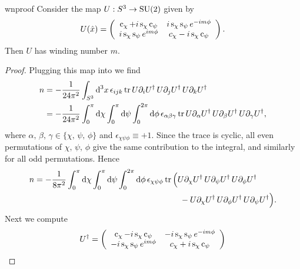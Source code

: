 \begin{proposition}{}{wnproof}
Consider the map $U:S^3\to\operatorname{SU}(2)$ given by
$$
U(\hat{x})=\left(\begin{array}{cc}
             \operatorname{c}_\chi+i\operatorname{s}_\chi\operatorname{c}_\psi     & i\operatorname{s}_\chi\operatorname{s}_\psi e^{-im\phi}\\
             i\operatorname{s}_\chi\operatorname{s}_\psi e^{im\phi}& c_\chi-i\operatorname{s}_\chi\operatorname{c}_\psi 
            \end{array}\right).
$$
Then $U$ has winding number $m$.
\begin{proof}
  Plugging this map into  we find
  \begin{equation*}
  \begin{aligned}
    n&=-\frac{1}{24\pi^2}\int_{S^3} \dd[3]{x}\epsilon_{ijk}\tr
        U\partial_i U^\dagger\,U\partial_j U^\dagger\,U\partial_k U^\dagger\\
   &=-\frac{1}{24\pi^2}\int_0^\pi\dd\chi\int_0^\pi\dd{\psi}\int_0^{2\pi}
        \dd{\phi}\epsilon_{\alpha\beta\gamma}\tr
        U\partial_\alpha U^\dagger\,U\partial_\beta U^\dagger\,
        U\partial_\gamma U^\dagger,\\
  \end{aligned}
  \end{equation*}
  where $\alpha,\,\beta,\,\gamma\in\{\chi,\,\psi,\,\phi\}$ and
  $\epsilon_{\chi\psi\phi}\equiv+1$.
  Since the trace is cyclic, all even permutations of $\chi,\,\psi,\,\phi$ give
  the same contribution to the integral, and similarly for all odd
  permutations. Hence
  \begin{equation*}\begin{aligned}
    n=-\frac{1}{8\pi^2}\int_0^\pi\dd{\chi}\int_0^\pi\dd\psi\int_0^{2\pi}
        \dd{\phi}\epsilon_{\chi\psi\phi}&\tr\Big(
        U\partial_\chi U^\dagger\,U\partial_\psi U^\dagger\,
        U\partial_\phi U^\dagger\\
        &~~~~~~-U\partial_\chi U^\dagger\,U\partial_\phi U^\dagger\,
        U\partial_\psi U^\dagger\Big).
  \end{aligned}\end{equation*}
  Next we compute
  \begin{equation*}
  \begin{aligned}
    U^\dagger&=\left(\begin{array}{cc}
                  \co_\chi-i\s_\chi\co_\psi & -i\s_\chi\s_\psi e^{-im\phi}\\
                 -i\s_\chi\s_\psi e^{im\phi}& c_\chi+i\s_\chi\co_\psi 
                \end{array}\right)\\

\end{aligned}
\end{equation*}
\end{proof}
\end{proposition}
